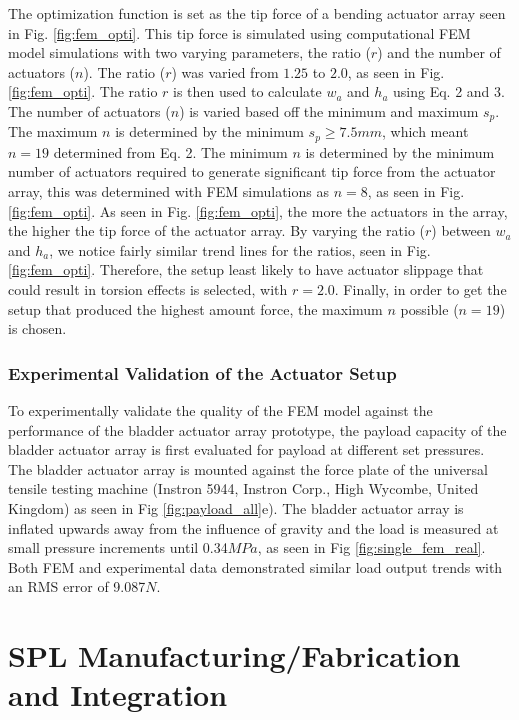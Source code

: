 \documentclass[letterpaper, 10 pt, conference]{ieeeconf}  %
\begin{document}
The optimization function is set as the tip force of a bending actuator array seen in Fig. \ref{fig:fem_opti}. This tip force is simulated using computational FEM model simulations with two varying parameters, the ratio ($r$) and the number of actuators ($n$). The ratio ($r$) was varied from $1.25$ to $2.0$, as seen in Fig. \ref{fig:fem_opti}. The ratio $r$ is then used to calculate $w_a$ and $h_a$ using Eq. 2 and 3. The number of actuators ($n$) is varied based off the minimum and maximum $s_p$. The maximum $n$ is determined by the minimum $s_p \geq 7.5mm$, which meant $n = 19$ determined from Eq. 2. The minimum $n$ is determined by the minimum number of actuators required to generate significant tip force from the actuator array, this was determined with FEM simulations as $n = 8$, as seen in Fig. \ref{fig:fem_opti}. As seen in Fig. \ref{fig:fem_opti}, the more the actuators in the array, the higher the tip force of the actuator array. By varying the ratio ($r$) between $w_a$ and $h_a$, we notice fairly similar trend lines for the ratios, seen in Fig. \ref{fig:fem_opti}. Therefore, the setup least likely to have actuator slippage that could result in torsion effects is selected, with $r =2.0$. Finally, in order to get the setup that produced the highest amount force, the maximum $n$ possible ($n = 19$) is chosen.

\subsubsection{Experimental Validation of the Actuator Setup}

To experimentally validate the quality of the FEM model against the performance of the bladder actuator array prototype, the payload capacity of the bladder actuator array is first evaluated for payload at different set pressures. The bladder actuator array is mounted against the force plate of the universal tensile testing machine (Instron 5944, Instron Corp., High Wycombe, United Kingdom) as seen in Fig \ref{fig:payload_all}e). The bladder actuator array is inflated upwards away from the influence of gravity and the load is measured at small pressure increments until 0.34$MPa$, as seen in Fig \ref{fig:single_fem_real}. Both FEM and experimental data demonstrated similar load output trends with an RMS error of 9.087$N$. 


\section{SPL Manufacturing/Fabrication and Integration}
\end{document}
